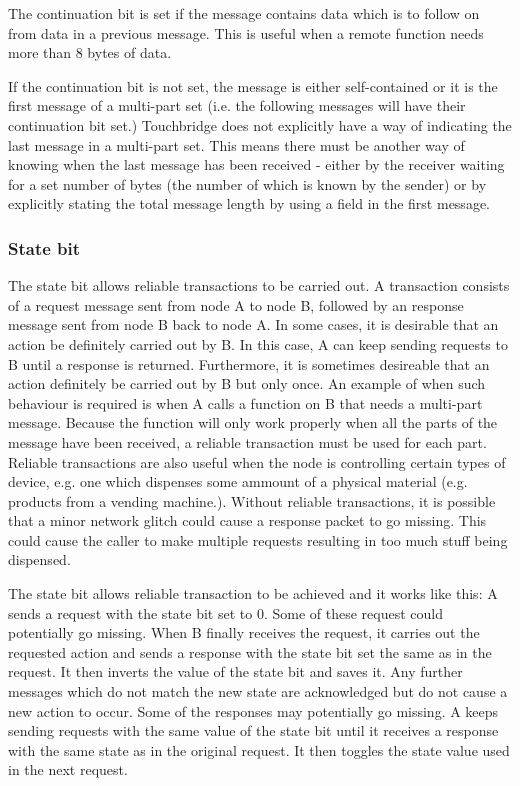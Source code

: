 \documentclass[12pt]{article}
\begin{document}
    The continuation bit is set if the message contains data which is to follow
on from data in a previous message. This is useful when a remote function needs
more than 8 bytes of data.

    If the continuation bit is not set, the message is either self-contained or
it is the first message of a multi-part set (i.e. the following messages will
have their continuation bit set.) Touchbridge does not explicitly have a way of
indicating the last message in a multi-part set. This means there must be
another way of knowing when the last message has been received - either by the
receiver waiting for a set number of bytes (the number of which is known by the
sender) or by explicitly stating the total message length by using a field in
the first message.

\subsubsection{State bit}

    The state bit allows reliable transactions to be carried out. A transaction
consists of a request message sent from node A to node B, followed by an
response message sent from node B back to node A. In some cases, it is
desirable that an action be definitely carried out by B. In this case, A can
keep sending requests to B until a response is returned. Furthermore, it is
sometimes desireable that an action definitely be carried out by B but only
once. An example of when such behaviour is required is when A calls a function
on B that needs a multi-part message.  Because the function will only work
properly when all the parts of the message have been received, a reliable
transaction must be used for each part. Reliable transactions are also useful
when the node is controlling certain types of device, e.g. one which dispenses
some ammount of a physical material (e.g. products from a vending machine.).
Without reliable transactions, it is possible that a minor network glitch could
cause a response packet to go missing. This could cause the caller to make
multiple requests resulting in too much stuff being dispensed.

The state bit allows reliable transaction to be achieved and it works like
this: A sends a request with the state bit set to 0. Some of these request
could potentially go missing. When B finally receives the request, it carries
out the requested action and sends a response with the state bit set the same
as in the request.  It then inverts the value of the state bit and saves it.
Any further messages which do not match the new state are acknowledged but do
not cause a new action to occur. Some of the responses may potentially go
missing. A keeps sending requests with the same value of the state bit until it
receives a response with the same state as in the original request. It then
toggles the state value used in the next request.
\end{document}
